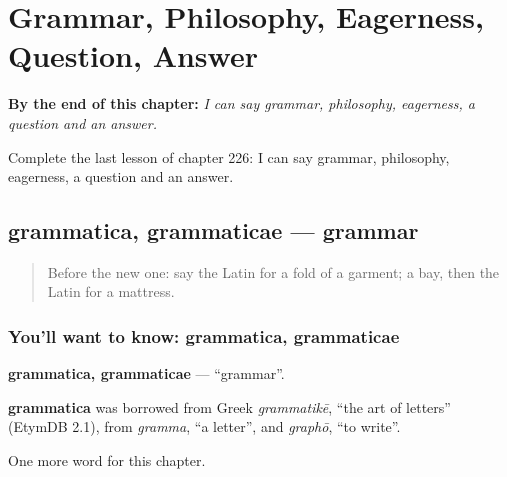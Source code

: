 
\chapter{Grammar, Philosophy, Eagerness, Question, Answer}
\label{ch:la-grammar-philosophy-eagerness-question-answer}

\begin{chapteropening}
\textbf{By the end of this chapter:} \emph{I can say grammar, philosophy, eagerness, a question and an answer.}

Complete the last lesson of chapter 226: I can say grammar, philosophy, eagerness, a question and an answer.
\end{chapteropening}

\section[grammatica, grammaticae]{grammatica, grammaticae — grammar}

\label{lesson:LA-C226-grammatica}



\begin{quote}
Before the new one: say the Latin for a fold of a garment; a bay, then the Latin for a mattress.
\end{quote}

\subsection*{You'll want to know: grammatica, grammaticae}
\textbf{grammatica, grammaticae} — \textquotedblleft{}grammar\textquotedblright{}.

\begin{cousinweb}
\textbf{grammatica} was borrowed from Greek \emph{grammatikē}, \textquotedblleft{}the art of letters\textquotedblright{} (EtymDB 2.1), from \emph{gramma}, \textquotedblleft{}a letter\textquotedblright{}, and \emph{graphō}, \textquotedblleft{}to write\textquotedblright{}.
\end{cousinweb}

\begin{grammarlens}[title={What you've built}]
One more word for this chapter.
\end{grammarlens}

